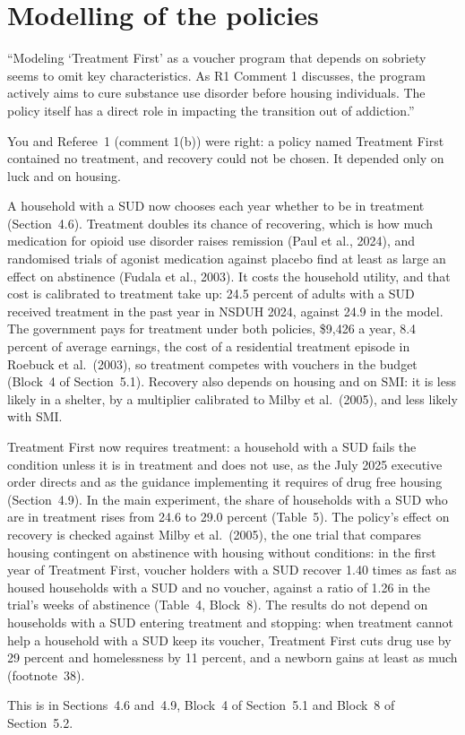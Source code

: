 \documentclass[11pt]{article}
\begin{document}
\section*{Modelling of the policies}

\begin{referee}
``Modeling `Treatment First' as a voucher program that depends on sobriety seems
to omit key characteristics. As R1 Comment 1 discusses, the program actively aims
to cure substance use disorder before housing individuals. The policy itself has a
direct role in impacting the transition out of addiction.''
\end{referee}
\begin{response}
\concede You and Referee~1 (comment 1(b)) were right: a policy named Treatment
First contained no treatment, and recovery could not be chosen. It depended only on
luck and on housing.

A household with a SUD now chooses each year whether to be in treatment
(Section~4.6). Treatment doubles its chance of recovering, which is how much
medication for opioid use disorder raises remission (Paul et al., 2024), and
randomised trials of agonist medication against placebo find at least as large an
effect on abstinence (Fudala et al., 2003). It costs the household utility, and that
cost is calibrated to treatment take up: 24.5 percent of adults with a SUD received
treatment in the past year in NSDUH 2024, against 24.9 in the model. The government
pays for treatment under both policies, \$9,426 a year, 8.4 percent of average
earnings, the cost of a residential treatment episode in Roebuck et al.\ (2003), so
treatment competes with vouchers in the budget (Block~4 of Section~5.1). Recovery
also depends on housing and on SMI: it is less likely in a shelter, by a multiplier
calibrated to Milby et al.\ (2005), and less likely with SMI.

Treatment First now requires treatment: a household with a SUD fails the condition
unless it is in treatment and does not use, as the July 2025 executive order
directs and as the guidance implementing it requires of drug free housing
(Section~4.9). In the main experiment, the share of households with a SUD who are in
treatment rises from 24.6 to 29.0 percent (Table~5). The policy's effect on recovery
is checked against Milby et al.\ (2005), the one trial that compares housing
contingent on abstinence with housing without conditions: in the first year of
Treatment First, voucher holders with a SUD recover 1.40 times as fast as housed
households with a SUD and no voucher, against a ratio of 1.26 in the trial's weeks
of abstinence (Table~4, Block~8). The results do not depend on households with a
SUD entering treatment and stopping: when treatment cannot help a household with a
SUD keep its voucher, Treatment First cuts drug use by 29 percent and homelessness
by 11 percent, and a newborn gains at least as much (footnote~38).

This is in Sections~4.6 and~4.9, Block~4 of Section~5.1 and Block~8 of
Section~5.2.
\end{response}
\end{document}
